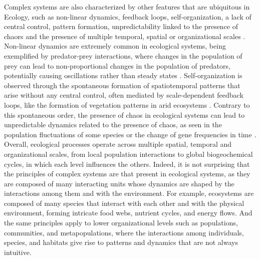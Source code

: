 Complex systems are also characterized by other features that are ubiquitous in
Ecology, such as non-linear dynamics, feedback loops, self-organization, a lack
of central control, pattern formation, unpredictability linked to the presence
of chaors and the presence of multiple temporal, spatial or organizational
scales \cite{Bianconi_2023}. Non-linear dynamics are extremely common in
ecological systems, being exemplified by predator-prey interactions, where
changes in the population of prey can lead to non-proportional changes in the
population of predators, potentially causing oscillations rather than steady
states \cite{Lotka1925}. Self-organization is observed through the spontaneous
formation of spatiotemporal patterns that arise without any central control,
often mediated by scale-dependent feedback loops, like the formation of
vegetation patterns in arid ecosystems \cite{Rietkerk2008}. Contrary to
this spontaneous order, the presence of chaos in ecological systems can lead to
unpredictable dynamics related to the presence of chaos, as seen in the
population fluctuations of some species or the change of gene frequencies in
time \cite{May1974,May1976}. Overall, ecological processes operate across
multiple spatial, temporal and organizational scales, from local population
interactions to global biogeochemical cycles, in which each level influences
the others. Indeed, it is not surprising that the principles of complex systems
are that present in ecological systems, as they are composed of many
interacting units whose dynamics are shaped by the interactions among them and
with the environment. For example, ecosystems are composed of many species that
interact with each other and with the physical environment, forming intricate
food webs, nutrient cycles, and energy flows. And the same principles apply to
lower organizational levels such as populations, communities, and
metapopulations, where the interactions among individuals, species, and
habitats give rise to patterns and dynamics that are not always intuitive.

